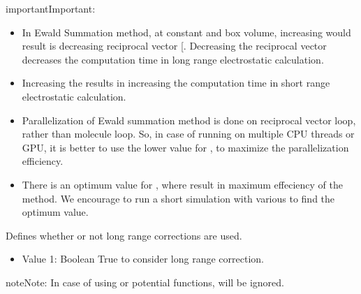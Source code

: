 \documentclass[letterpaper,10pt,english]{sphinxmanual}
\begin{document}
\begin{description}
\begin{sphinxadmonition}{important}{Important:}\begin{itemize}
\item {} 
\sphinxAtStartPar
In Ewald Summation method, at constant  and box volume, increasing  would result is decreasing reciprocal vector {[}\sphinxhref{https://www.tandfonline.com/doi/abs/10.1080/08927029408022180}{Fincham 1993}{]}.
Decreasing the reciprocal vector decreases the computation time in long range electrostatic calculation.

\item {} 
\sphinxAtStartPar
Increasing the  results in increasing the computation time in short range electrostatic calculation.

\item {} 
\sphinxAtStartPar
Parallelization of Ewald summation method is done on reciprocal vector loop, rather than molecule loop.
So, in case of running on multiple CPU threads or GPU, it is better to use the lower value for , to maximize the parallelization efficiency.

\item {} 
\sphinxAtStartPar
There is an optimum value for , where result in maximum effeciency of the method. We encourage to run a short simulation with various  to find the optimum value.

\end{itemize}
\end{sphinxadmonition}

\item[{\sphinxcode{\sphinxupquote{LRC}}}] \leavevmode
\sphinxAtStartPar
Defines whether or not long range corrections are used.
\begin{itemize}
\item {} 
\sphinxAtStartPar
Value 1: Boolean \sphinxhyphen{} True to consider long range correction.

\end{itemize}

\begin{sphinxadmonition}{note}{Note:}
\sphinxAtStartPar
In case of using  or  potential functions,  will be ignored.
\end{sphinxadmonition}


\end{description}
\end{document}
